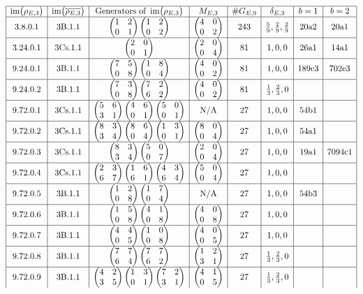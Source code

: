 \documentclass{article}
\theoremstyle{plain}
\theoremstyle{definition}
\newcommand{\im}{\operatorname{im}}
\newcommand{\br}{\!\del}
\newcommand{\twobytwo}[4]{\begin{pmatrix} #1 & #2 \\ #3 & #4 \end{pmatrix}}
\begin{document}
$$
\begin{array}{|c|c|c|c|c|c|c|c|}
\hline
\im\br{\rho_{E, 3}} & \im\br{\overline{\rho_{E, 3}}} & \text{Generators of} \ \im\br{\rho_{E, 3}} & M_{E, 3} & \#G_{E, 9} & \delta_{E, 3} & b = 1 & b = 2 \\
\hline
3.8.0.1 & \text{3B.1.1} & \twobytwo{1}{2}{0}{1} \twobytwo{1}{2}{0}{2} & \twobytwo{4}{0}{0}{2} & 243 & \tfrac{5}{9}, \tfrac{2}{9}, \tfrac{2}{9} & \text{20a2} & \text{20a1} \\
\hline
3.24.0.1 & \text{3Cs.1.1} & \twobytwo{2}{0}{0}{1} & \twobytwo{2}{0}{0}{4} & 81 & 1, 0, 0 & \text{26a1} & \text{14a1} \\
\hline
9.24.0.1 & \text{3B.1.1} & \twobytwo{7}{5}{0}{8} \twobytwo{1}{8}{0}{4} & \twobytwo{4}{0}{0}{2} & 81 & 1, 0, 0 & \text{189c3} & \text{702e3} \\
\hline
9.24.0.2 & \text{3B.1.1} & \twobytwo{7}{3}{0}{8} \twobytwo{7}{2}{6}{2} & \twobytwo{4}{0}{0}{2} & 81 & \tfrac{1}{3}, \tfrac{2}{3}, 0 & \text{} & \text{} \\
\hline
9.72.0.1 & \text{3Cs.1.1} & \twobytwo{5}{6}{3}{1} \twobytwo{4}{6}{0}{1} \twobytwo{5}{0}{0}{1} & \text{N/A} & 27 & 1, 0, 0 & \text{54b1} & \text{} \\
\hline
9.72.0.2 & \text{3Cs.1.1} & \twobytwo{8}{3}{3}{4} \twobytwo{8}{6}{0}{4} \twobytwo{1}{3}{0}{1} & \twobytwo{8}{0}{0}{4} & 27 & 1, 0, 0 & \text{54a1} & \text{} \\
\hline
9.72.0.3 & \text{3Cs.1.1} & \twobytwo{8}{3}{3}{4} \twobytwo{5}{0}{0}{7} & \twobytwo{2}{0}{0}{4} & 27 & 1, 0, 0 & \text{19a1} & \text{7094c1} \\
\hline
9.72.0.4 & \text{3Cs.1.1} & \twobytwo{2}{3}{6}{7} \twobytwo{1}{6}{6}{1} \twobytwo{4}{3}{6}{4} & \twobytwo{5}{0}{0}{4} & 27 & 1, 0, 0 & \text{} & \text{} \\
\hline
9.72.0.5 & \text{3B.1.1} & \twobytwo{1}{2}{0}{8} \twobytwo{1}{7}{0}{4} & \text{N/A} & 27 & 1, 0, 0 & \text{54b3} & \text{} \\
\hline
9.72.0.6 & \text{3B.1.1} & \twobytwo{1}{5}{0}{8} \twobytwo{4}{1}{0}{8} & \twobytwo{4}{0}{0}{8} & 27 & 1, 0, 0 & \text{} & \text{} \\
\hline
9.72.0.7 & \text{3B.1.1} & \twobytwo{4}{4}{0}{5} \twobytwo{1}{0}{0}{8} & \twobytwo{4}{0}{0}{5} & 27 & 1, 0, 0 & \text{} & \text{} \\
\hline
9.72.0.8 & \text{3B.1.1} & \twobytwo{7}{7}{6}{4} \twobytwo{7}{7}{6}{2} & \twobytwo{1}{2}{3}{1} & 27 & \tfrac{1}{3}, \tfrac{2}{3}, 0 & \text{} & \text{} \\
\hline
9.72.0.9 & \text{3B.1.1} & \twobytwo{4}{2}{3}{5} \twobytwo{1}{3}{0}{1} \twobytwo{7}{2}{3}{1} & \twobytwo{4}{1}{0}{5} & 27 & \tfrac{1}{3}, \tfrac{2}{3}, 0 & \text{} & \text{} \\

\end{array}$$
\end{document}
